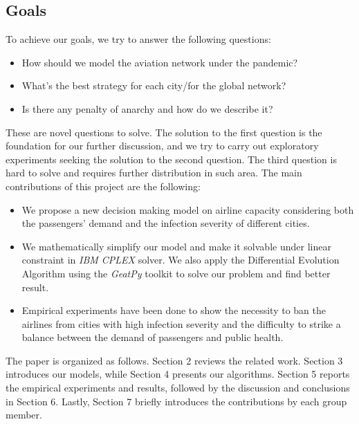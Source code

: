 \subsection{Goals}
To achieve our goals, we try to answer the following questions:
\begin{itemize}    
    \item How should we model the aviation network under the pandemic?
    \item What's the best strategy for each city/for the global network?
    \item Is there any penalty of anarchy and how do we describe it?
\end{itemize}


These are novel questions to solve. The solution to the first question is the foundation for our further discussion, and we try to carry out exploratory experiments seeking the solution to the second question. The third question is hard to solve and requires further distribution in such area. The main contributions of this project are the following:
\begin{itemize}
    \item We propose a new decision making model on airline capacity considering both the passengers' demand and the infection severity of different cities.
    \item We mathematically simplify our model and make it solvable under linear constraint in \emph{IBM CPLEX} solver. We also apply the Differential Evolution Algorithm using the \emph{GeatPy}\cite{geatpy} toolkit to solve our problem and find better result.
    
    \item Empirical experiments have been done to show the necessity to ban the airlines from cities with high infection severity and the difficulty to strike a balance between the demand of passengers and public health. 
\end{itemize}

The paper is organized as follows. Section 2 reviews the related work. Section 3 introduces our models, while Section 4 presents our algorithms. Section 5 reports the empirical experiments and results, followed by the discussion and conclusions in Section 6. Lastly, Section 7 briefly introduces the contributions by each group member. 


